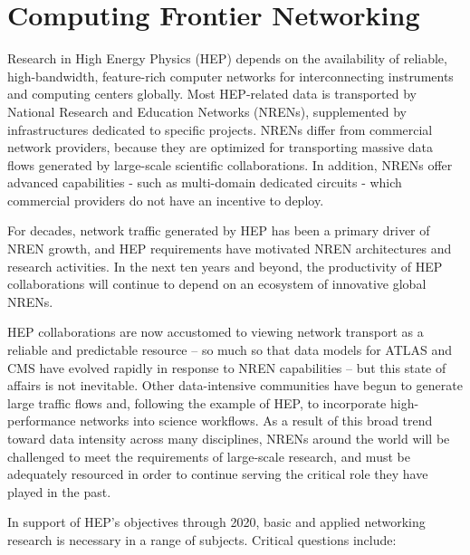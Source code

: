\section{Computing Frontier Networking}


Research in High Energy Physics (HEP) depends on the availability of reliable, high-bandwidth, feature-rich computer networks for interconnecting instruments and computing centers globally. Most HEP-related data is transported by National Research and Education Networks (NRENs), supplemented by infrastructures dedicated to specific projects. NRENs differ from commercial network providers, because they are optimized for transporting massive data flows generated by large-scale scientific collaborations. In addition, NRENs offer advanced capabilities - such as multi-domain dedicated circuits - which commercial providers do not have an incentive to deploy.

For decades, network traffic generated by HEP has been a primary driver of NREN growth, and HEP requirements have motivated NREN architectures and research activities. In the next ten years and beyond, the productivity of HEP collaborations will continue to depend on an ecosystem of innovative global NRENs. 

HEP collaborations are now accustomed to viewing network transport as a reliable and predictable resource – so much so that data models for ATLAS and CMS have evolved rapidly in response to NREN capabilities – but this state of affairs is not inevitable. Other data-intensive communities have begun to generate large traffic flows and, following the example of HEP, to incorporate high-performance networks into science workflows. As a result of this broad trend toward data intensity across many disciplines, NRENs around the world will be challenged to meet the requirements of large-scale research, and must be adequately resourced in order to continue serving the critical role they have played in the past.  

In support of HEP’s objectives through 2020, basic and applied networking research is necessary in a range of subjects. Critical questions include: 

